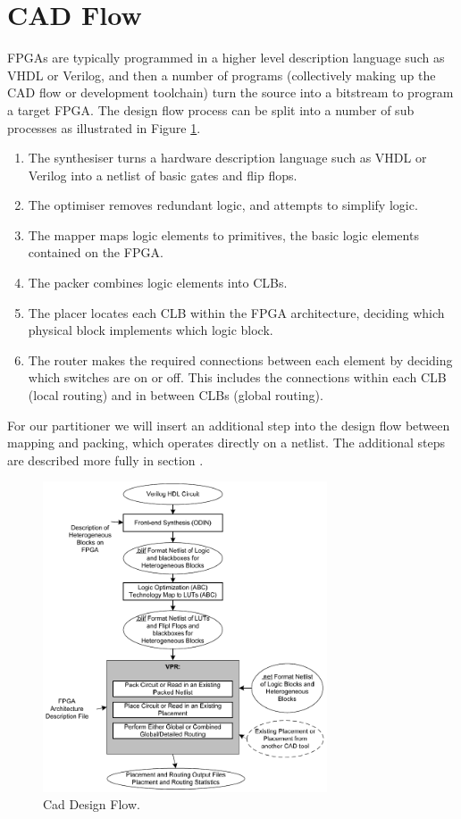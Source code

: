 \documentclass[12pt,final,oneside]{dwThesis} %
\begin{document}
   \section{\acs{CAD} Flow}
   \acp{FPGA} are typically programmed in a higher level description language such as VHDL or Verilog, and then a number of programs (collectively making up the \ac{CAD} flow or development toolchain) turn the source into a bitstream to program a target \ac{FPGA}.
   The design flow process can be split into a number of sub processes as illustrated in Figure \ref{CADFlow}\cite{VPRBook,VPRManual,FPGAArch}.
   \begin{enumerate}
      \item The synthesiser turns a hardware description language such as VHDL or Verilog into a netlist of basic gates and flip flops.
      \item The optimiser removes redundant logic, and attempts to simplify logic.
      \item The mapper maps logic elements to primitives, the basic logic elements contained on the \ac{FPGA}.
      \item The packer combines logic elements into \acp{CLB}.
      \item The placer locates each \ac{CLB} within the \ac{FPGA} architecture, deciding which physical block implements which logic block.
      \item The router makes the required connections between each element by deciding which switches are on or off. This includes the connections within each \ac{CLB} (local routing) and in between \acp{CLB} (global routing).
   \end{enumerate}
   For our partitioner we will insert an additional step into the design flow between mapping and packing, which operates directly on a netlist. The additional steps are described more fully in section .

   \begin{figure}
      \begin{center}
         \includegraphics[width=0.75\textwidth]{images/vpr-cad.png}
         \caption{Cad Design Flow.\cite{VPRManual}}
         \label{CADFlow}
      \end{center}
   \end{figure}
\end{document}
